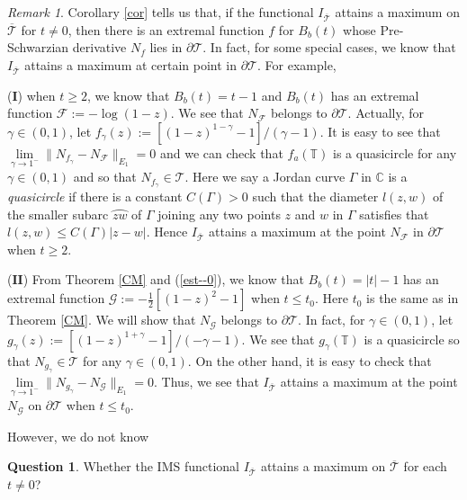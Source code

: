 \documentclass[11pt]{amsart}
\theoremstyle{remark}
\newtheorem{remark}[theorem]{Remark}
\theoremstyle{claim}
\theoremstyle{definition}
\theoremstyle{problem}
\theoremstyle{conjecture}
\theoremstyle{question}
\newtheorem{question}[theorem]{Question}
\numberwithin{equation}{section}
\begin{document}
 \begin{remark} Corollary \ref{cor} tells us that, if the functional $I_{\overline{\mathcal{T}}}$  attains a maximum on $\overline{\mathcal{T}}$ for $t \neq 0$,  then there is an extremal function $f$ for $B_b(t)$ whose Pre-Schwarzian derivative $N_f$ lies in $\partial \mathcal{T}$. In fact, for some special cases, we know that $I_{\overline{\mathcal{T}}}$ attains a maximum at certain point in $\partial{\mathcal{T}}$.   For example,

 ($\mathbf{I}$) when $t\geq 2$, we know that $B_b(t)=t-1$ and $B_b(t)$ has an extremal function $\mathcal{F}:=-\log(1-z)$. We see that $N_{\mathcal{F}}$ belongs to $\partial \mathcal{T}$. Actually,  for $\gamma\in (0,1)$, let $f_{\gamma}(z):=[(1-z)^{1-\gamma}-1]/(\gamma-1).$ It is easy to see that $\lim\limits_{\gamma\rightarrow 1^{-}} \|N_{f_{\gamma}}-N_{\mathcal{F}}\|_{E_1}=0$ and we can check that $f_{a}(\mathbb{T})$ is a quasicircle for any
 $\gamma\in (0,1)$ and so that $N_{f_\gamma} \in \mathcal{T}$. Here we say a Jordan curve $\Gamma$ in $\mathbb{C}$ is a {\em quasicircle} if there is a constant $C(\Gamma)>0$ such that the diameter $l(z,w)$ of the smaller subarc $\wideparen{zw}$ of $\Gamma$ joining any two points $z$ and $w$ in $\Gamma$ satisfies that $l(z,w)\leq C(\Gamma)|z-w|$.
Hence $I_{\overline{\mathcal{T}}}$ attains a maximum at the point $N_{\mathcal{F}}$ in $\partial \mathcal{T}$ when $t\geq 2$.

 ($\mathbf{II}$)  From Theorem \ref{CM} and (\ref{est--0}), we know that $B_{b}(t)=|t|-1$ has an extremal function $\mathcal{G}:=-\frac{1}{2}[(1-z)^2-1]$ when $t\leq t_0$. Here $t_0$ is the same as in Theorem \ref{CM}.  We will show that $N_{\mathcal{G}}$ belongs to $\partial \mathcal{T}$. In fact, for $\gamma\in (0,1)$, let $g_{\gamma}(z):=[(1-z)^{1+\gamma}-1]/(-\gamma-1).$  We see that  $g_{\gamma}(\mathbb{T})$ is a quasicircle so that $N_{g_\gamma} \in \mathcal{T}$ for any
 $\gamma\in (0,1)$. On the other hand, it is easy to check that $\lim\limits_{\gamma\rightarrow 1^{-}} \|N_{g_{\gamma}}-N_{\mathcal{G}}\|_{E_1}=0.$ Thus, we see that
  $I_{\overline{\mathcal{T}}}$ attains a maximum at the point $N_{\mathcal{G}}$ on $\partial \mathcal{T}$ when $t\leq t_0$.  
  
However, we do not know
 \begin{question}\label{q-2}
Whether the IMS functional $I_{\overline{\mathcal{T}}}$ attains a maximum on $\overline{\mathcal{T}}$ for each $t\neq 0$?
  \end{question}
 \end{remark}
 
\end{document}
